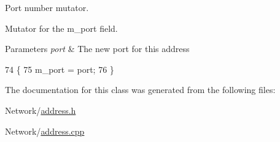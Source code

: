 Port number mutator. 

Mutator for the m\-\_\-port field. 
\begin{DoxyParams}{Parameters}
{\em port} & The new port for this address \\
\hline
\end{DoxyParams}

\begin{DoxyCode}
74 \{
75     m\_port = port;
76 \}
\end{DoxyCode}


The documentation for this class was generated from the following files\-:\begin{DoxyCompactItemize}
\item 
Network/\hyperlink{address_8h}{address.\-h}\item 
Network/\hyperlink{address_8cpp}{address.\-cpp}\end{DoxyCompactItemize}
